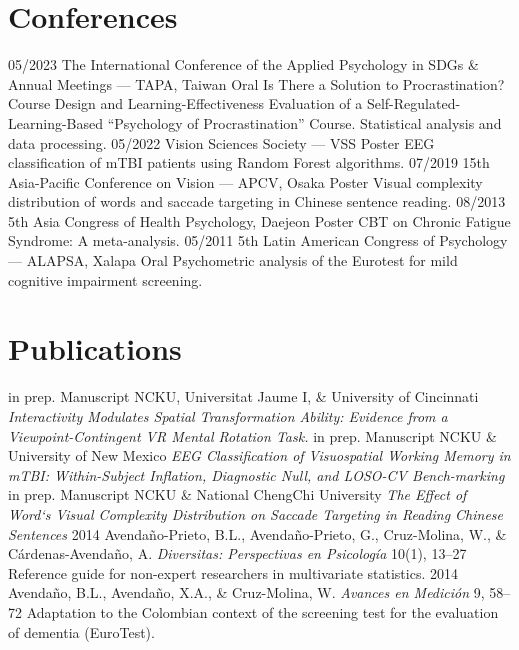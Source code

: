 \documentclass[]{friggeri-cv}
\begin{document}
\section{Conferences}
\begin{entrylist}
  \entry
    {05/2023}
    {The International Conference of the Applied Psychology in SDGs \& Annual Meetings — TAPA, Taiwan}
    {Oral}
    {Is There a Solution to Procrastination? Course Design and Learning-Effectiveness Evaluation of a Self-Regulated-Learning-Based ``Psychology of Procrastination'' Course. Statistical analysis and data processing.}
  \entry
    {05/2022}
    {Vision Sciences Society — VSS}
    {Poster}
    {EEG classification of mTBI patients using Random Forest algorithms.}
  \entry
    {07/2019}
    {15th Asia-Pacific Conference on Vision — APCV, Osaka}
    {Poster}
    {Visual complexity distribution of words and saccade targeting in Chinese sentence reading.}
  \entry
    {08/2013}
    {5th Asia Congress of Health Psychology, Daejeon}
    {Poster}
    {CBT on Chronic Fatigue Syndrome: A meta-analysis.}
  \entry
    {05/2011}
    {5th Latin American Congress of Psychology — ALAPSA, Xalapa}
    {Oral}
    {Psychometric analysis of the Eurotest for mild cognitive impairment screening.}
\end{entrylist}
\newpage

\section{Publications}
\begin{entrylist}
  \entry
    {in prep.}
    {Manuscript}
    {NCKU, Universitat Jaume I, \& University of Cincinnati}
    {\textit{Interactivity Modulates Spatial Transformation Ability: Evidence from a Viewpoint-Contingent VR Mental Rotation Task.}}
  \entry
    {in prep.}
    {Manuscript}
    {NCKU \& University of New Mexico}
    {\textit{EEG Classification of Visuospatial Working Memory in mTBI: Within-Subject Inflation, Diagnostic Null, and LOSO-CV Bench-marking}}
  \entry
    {in prep.}
    {Manuscript}
    {NCKU \& National ChengChi University}
    {\textit{The Effect of Word`s Visual Complexity Distribution on Saccade Targeting in Reading Chinese Sentences}}
  \entry
    {2014}
    {Avendaño-Prieto, B.L., Avendaño-Prieto, G., Cruz-Molina, W., \& Cárdenas-Avendaño, A.}
    {\textit{Diversitas: Perspectivas en Psicología} 10(1), 13--27}
    {Reference guide for non-expert researchers in multivariate statistics.}
  \entry
    {2014}
    {Avendaño, B.L., Avendaño, X.A., \& Cruz-Molina, W.}
    {\textit{Avances en Medición} 9, 58--72}
    {Adaptation to the Colombian context of the screening test for the evaluation of dementia (EuroTest).}
\end{entrylist}
\end{document}
